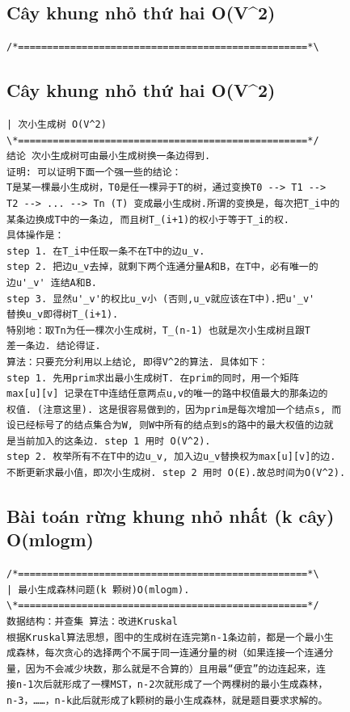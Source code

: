 \documentclass[11pt]{article}
\begin{document}
\subsection{Cây khung nhỏ thứ hai O(V\textasciicircum{}2)}

\begingroup
\scriptsize
\begin{verbatim}
/*==================================================*\
\end{verbatim}
\endgroup

\subsection{Cây khung nhỏ thứ hai O(V\textasciicircum{}2)}

\begingroup
\scriptsize
\begin{verbatim}
| 次小生成树 O(V^2)
\*==================================================*/
结论 次小生成树可由最小生成树换一条边得到.
证明: 可以证明下面一个强一些的结论：
T是某一棵最小生成树，T0是任一棵异于T的树，通过变换T0 --> T1 -->
T2 --> ... --> Tn (T) 变成最小生成树.所谓的变换是，每次把T_i中的
某条边换成T中的一条边, 而且树T_(i+1)的权小于等于T_i的权.
具体操作是：
step 1. 在T_i中任取一条不在T中的边u_v.
step 2. 把边u_v去掉，就剩下两个连通分量A和B，在T中，必有唯一的
边u'_v' 连结A和B.
step 3. 显然u'_v'的权比u_v小 (否则,u_v就应该在T中).把u'_v'
替换u_v即得树T_(i+1).
特别地：取Tn为任一棵次小生成树，T_(n-1) 也就是次小生成树且跟T
差一条边. 结论得证.
算法：只要充分利用以上结论, 即得V^2的算法. 具体如下：
step 1. 先用prim求出最小生成树T. 在prim的同时，用一个矩阵
max[u][v] 记录在T中连结任意两点u,v的唯一的路中权值最大的那条边的
权值. (注意这里). 这是很容易做到的，因为prim是每次增加一个结点s, 而
设已经标号了的结点集合为W, 则W中所有的结点到s的路中的最大权值的边就
是当前加入的这条边. step 1 用时 O(V^2).
step 2. 枚举所有不在T中的边u_v, 加入边u_v替换权为max[u][v]的边.
不断更新求最小值，即次小生成树. step 2 用时 O(E).故总时间为O(V^2).
\end{verbatim}
\endgroup

\subsection{Bài toán rừng khung nhỏ nhất (k cây) O(mlogm)}

\begingroup
\scriptsize
\begin{verbatim}
/*==================================================*\
| 最小生成森林问题(k 颗树)O(mlogm).
\*==================================================*/
数据结构：并查集 算法：改进Kruskal
根据Kruskal算法思想，图中的生成树在连完第n-1条边前，都是一个最小生
成森林，每次贪心的选择两个不属于同一连通分量的树（如果连接一个连通分
量，因为不会减少块数，那么就是不合算的）且用最“便宜”的边连起来，连
接n-1次后就形成了一棵MST，n-2次就形成了一个两棵树的最小生成森林，
n-3，……，n-k此后就形成了k颗树的最小生成森林，就是题目要求求解的。
\end{verbatim}
\endgroup
\end{document}
